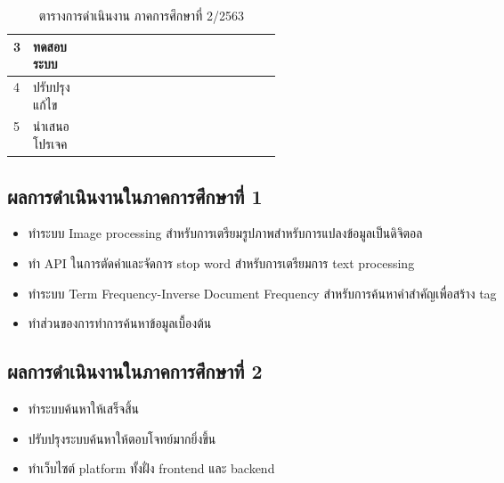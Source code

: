 \begin{table}[H]
\begin{tabular}{|l|p{0.35\linewidth}|l|l|l|l|l|l|l|l|l|l|l|l|l|l|l|l|}
3                  & ทดสอบระบบ                   &                          &                          &                          &                          & \cellcolor[HTML]{656565} & \cellcolor[HTML]{656565} & \cellcolor[HTML]{656565} & \cellcolor[HTML]{656565} & \cellcolor[HTML]{656565} & \cellcolor[HTML]{656565} & \cellcolor[HTML]{656565} & \cellcolor[HTML]{656565} & \cellcolor[HTML]{656565} & \cellcolor[HTML]{656565} &                          &                          \\ \hline
4                  & ปรับปรุงแก้ไข                   &                          &                          &                          &                          & \cellcolor[HTML]{656565} & \cellcolor[HTML]{656565} & \cellcolor[HTML]{656565} & \cellcolor[HTML]{656565} & \cellcolor[HTML]{656565} & \cellcolor[HTML]{656565} & \cellcolor[HTML]{656565} & \cellcolor[HTML]{656565} & \cellcolor[HTML]{656565} & \cellcolor[HTML]{656565} &                          &                          \\ \hline
5                  & นำเสนอโปรเจค                   &                          &                          &                          &                          &                          &                          &                          &                          &                          &                          &                          &                          &                          &                          & \cellcolor[HTML]{656565} & \cellcolor[HTML]{656565} \\ \hline
\end{tabular}
\caption{ตารางการดำเนินงาน ภาคการศึกษาที่ 2/2563}\label{tbl:work2}
\end{table}

\subsection{ผลการดำเนินงานในภาคการศึกษาที่ 1}
\begin{itemize}
    \item ทำระบบ Image processing สำหรับการเตรียมรูปภาพสำหรับการแปลงข้อมูลเป็นดิจิตอล
    \item ทำ API ในการตัดคำและจัดการ stop word สำหรับการเตรียมการ text processing
    \item ทำระบบ Term Frequency-Inverse Document Frequency สำหรับการค้นหาคำสำคัญเพื่อสร้าง tag 
    \item ทำส่วนของการทำการค้นหาข้อมูลเบื้องต้น
\end{itemize}

\subsection{ผลการดำเนินงานในภาคการศึกษาที่ 2}
\begin{itemize}
    \item ทำระบบค้นหาให้เสร็จสิ้น
    \item ปรับปรุงระบบค้นหาให้ตอบโจทย์มากยิ่งขึ้น
    \item ทำเว็บไซต์ platform ทั้งฝั่ง frontend และ backend
\end{itemize}

